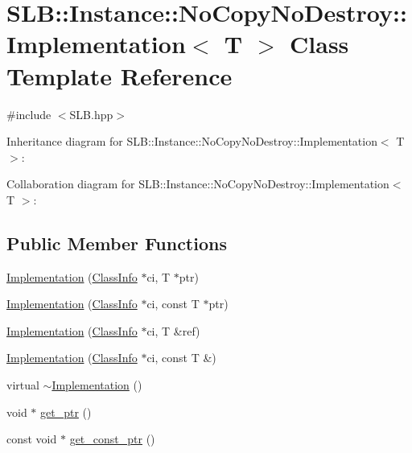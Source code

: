 \hypertarget{classSLB_1_1Instance_1_1NoCopyNoDestroy_1_1Implementation}{}\section{S\+LB\+:\+:Instance\+:\+:No\+Copy\+No\+Destroy\+:\+:Implementation$<$ T $>$ Class Template Reference}
\label{classSLB_1_1Instance_1_1NoCopyNoDestroy_1_1Implementation}


{\ttfamily \#include $<$S\+L\+B.\+hpp$>$}



Inheritance diagram for S\+LB\+:\+:Instance\+:\+:No\+Copy\+No\+Destroy\+:\+:Implementation$<$ T $>$\+:


Collaboration diagram for S\+LB\+:\+:Instance\+:\+:No\+Copy\+No\+Destroy\+:\+:Implementation$<$ T $>$\+:
\subsection*{Public Member Functions}
\begin{DoxyCompactItemize}
\item 
\hyperlink{classSLB_1_1Instance_1_1NoCopyNoDestroy_1_1Implementation_ab456b7a86688c78e69f57711c4878813}{Implementation} (\hyperlink{classSLB_1_1ClassInfo}{Class\+Info} $\ast$ci, T $\ast$ptr)
\item 
\hyperlink{classSLB_1_1Instance_1_1NoCopyNoDestroy_1_1Implementation_a5ea5cd565ccfebdab186847d2ab09b29}{Implementation} (\hyperlink{classSLB_1_1ClassInfo}{Class\+Info} $\ast$ci, const T $\ast$ptr)
\item 
\hyperlink{classSLB_1_1Instance_1_1NoCopyNoDestroy_1_1Implementation_a09d0a3eb7afb4a5e2299d99f196aeb11}{Implementation} (\hyperlink{classSLB_1_1ClassInfo}{Class\+Info} $\ast$ci, T \&ref)
\item 
\hyperlink{classSLB_1_1Instance_1_1NoCopyNoDestroy_1_1Implementation_ae97b748bb6fc4769dd12109d04cd4170}{Implementation} (\hyperlink{classSLB_1_1ClassInfo}{Class\+Info} $\ast$ci, const T \&)
\item 
virtual \hyperlink{classSLB_1_1Instance_1_1NoCopyNoDestroy_1_1Implementation_aaac2597b7ce658c55a7102f9a946a00b}{$\sim$\+Implementation} ()
\item 
void $\ast$ \hyperlink{classSLB_1_1Instance_1_1NoCopyNoDestroy_1_1Implementation_a0229bb8610b5fdb395c34bdfeadf3e48}{get\+\_\+ptr} ()
\item 
const void $\ast$ \hyperlink{classSLB_1_1Instance_1_1NoCopyNoDestroy_1_1Implementation_ac516ee840c0c2ef51135647b0e74bc00}{get\+\_\+const\+\_\+ptr} ()
\end{DoxyCompactItemize}
